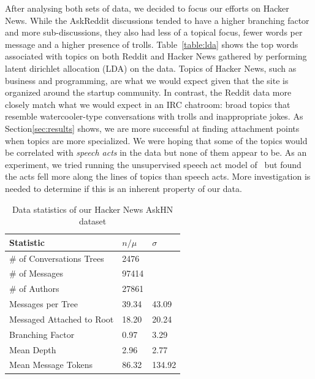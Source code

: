 \documentclass{article}
\begin{document}
After analysing both sets of data, we decided to focus our efforts on Hacker News.
While the AskReddit discussions tended to have a higher branching factor 
and more sub-discussions, they also had less of a topical focus, fewer words per message
and a higher presence of trolls. Table~\ref{table:lda} shows the top words associated
with topics on both Reddit and Hacker News gathered by performing latent dirichlet allocation (LDA)
on the data. Topics of Hacker News, such as business and programming, are 
what we would expect given that the site is organized around the startup community.
In contrast, the Reddit data more closely match what we would expect in an IRC
chatroom: broad topics that resemble watercooler-type conversations with trolls
and inappropriate jokes. As Section\ref{sec:results} shows, we are more successful
at finding attachment points when topics are more specialized. We were hoping that
some of the topics would be correlated with \textit{speech acts} in the data but 
none of them appear to be. As an experiment, we tried running the unsupervised speech act 
model of~\cite{Paula} but found the acts fell more along the lines of 
topics than speech acts. More investigation is needed to determine if this
is an inherent property of our data.


\begin{table}[h]\footnotesize
 \begin{tabular}{| l | l | l |} 
   \hline
   \textbf{Statistic} & \textbf{$n / \mu$} & \textbf{$\sigma$} \\
   \hline
   \# of Conversations Trees & 2476 & \\
   \# of Messages & 97414 & \\
   \# of Authors & 27861 & \\
   Messages per Tree & 39.34 & 43.09 \\
   Messaged Attached to Root &  18.20 & 20.24 \\
   Branching Factor & 0.97 & 3.29 \\
   Mean Depth & 2.96 & 2.77 \\
   Mean Message Tokens & 86.32 & 134.92 \\
   \hline
  \end{tabular}
  \caption{Data statistics of our Hacker News AskHN dataset}
  \label{table:stats}
\end{table}
\end{document}
